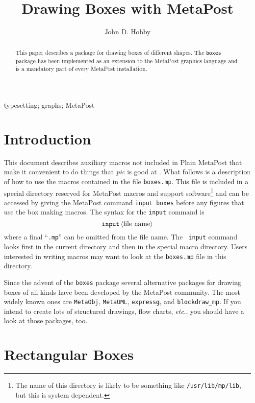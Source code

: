 \documentclass{article} %
\author{John D. Hobby}
\title{Drawing Boxes with {MetaPost}}
\date{}
\newcommand\descr[1]{{\langle\hbox{\rm#1}\rangle}}
\newcommand\myabstract{%
  This paper describes a package for drawing boxes of different shapes.
  The \texttt{boxes} package has been implemented as an extension to the
  MetaPost graphics language and is a mandatory part of every MetaPost
  installation.}
\newcommand\mykeywords{%
    typesetting; graphs; MetaPost}
\begin{document}
  \maketitle
  \begin{abstract} \myabstract \end{abstract}
  \ifx\keywords\undefined \else
    \begin{keywords} \mykeywords \end{keywords}
  \fi

\setlength{\columnsep}{2.5em}
\begin{multicols}{2}
\tableofcontents
\end{multicols}


\section{Introduction}
\label{intro}

This document describes auxiliary macros not included in Plain MetaPost
that make it convenient to do things that {\it pic} is good at
\cite{ke:pic}.  What follows is a description of how to use the macros
contained in the file {\tt boxes.mp}.
This file is included in a special directory reserved for MetaPost
macros and support software\footnote{The name of this directory is
  likely to be something like \texttt{/usr/lib/mp/lib}, but this is
  system dependent.}  and can be accessed by giving the MetaPost command
{\tt input boxes} before any figures that use the box making macros.
The syntax for the {\tt input} command is 
$$ {\tt input}\, \descr{file name} $$
where a final ``{\tt .mp}'' can be omitted from the file name.  The {\tt
  input} command looks first in the current directory and then in the
special macro directory.  Users interested in writing macros may want to
look at the {\tt boxes.mp} file in this directory.

Since the advent of the \texttt{boxes} package several alternative
packages for drawing boxes of all kinds have been developed by the
MetaPost community.  The most widely known ones are
\texttt{MetaObj},
\texttt{MetaUML},
\texttt{expressg}, and
\texttt{blockdraw\_mp}.  If
you intend to create lots of structured drawings, flow charts,
\emph{etc.}, you should have a look at those packages, too.


\section{Rectangular Boxes}
\label{rectbox}
\end{document}
